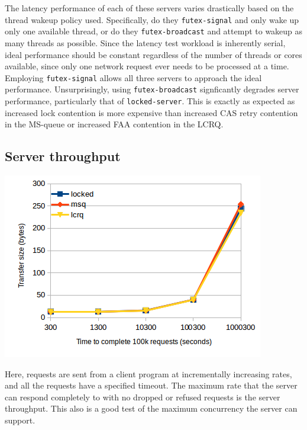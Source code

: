 \documentclass[twoside,10pt]{article}
\newenvironment{Figure}
  {\par\medskip\noindent\minipage{\linewidth}}
  {\endminipage\par\medskip}
\begin{document}
\begin{multicols}{2}
The latency performance of each of these servers varies drastically
based on the thread wakeup policy used. Specifically, do they
\verb+futex-signal+ and only wake up only one available thread, or do
they \verb+futex-broadcast+ and attempt to wakeup as many threads as
possible. Since the latency test workload is inherently serial, ideal
performance should be constant regardless of the number of threads or
cores available, since only one network request ever needs to be
processed at a time. Employing \verb+futex-signal+ allows all three
servers to approach the ideal performance. Unsurprisingly, using
\verb+futex-broadcast+ signficantly degrades server performance,
particularly that of \verb+locked-server+. This is exactly as expected
as increased lock contention is more expensive than increased CAS
retry contention in the MS-queue or increased FAA contention in the
LCRQ.

\subsection{Server throughput}

\begin{Figure}
\includegraphics[width=\linewidth]{img/latencyfilesize.png}
\end{Figure}

Here, requests are sent from a client program at incrementally
increasing rates, and all the requests have a specified
timeout. The maximum rate that the server can respond completely to
with no dropped or refused requests is the server throughput. This
also is a good test of the maximum concurrency the server can support.


\end{multicols}
\end{document}
